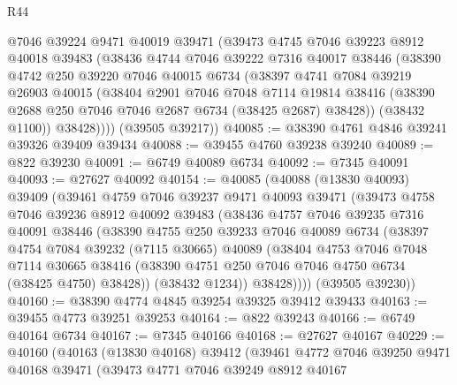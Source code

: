 \begin{lexlean}{R44}
\begin{coremodule}
{        @7046
        @39224
        @9471
        @40019
        @39471
        (@39473
          @4745
          @7046
          @39223
          @8912
          @40018
          @39483
          (@38436
            @4744
            @7046
            @39222
            @7316
            @40017
            @38446
            (@38390
              @4742
              @250
              @39220
              @7046
              @40015
              @6734
              (@38397
                @4741
                @7084
                @39219
                @26903
                @40015
                (@38404
                  @2901
                  @7046
                  @7048
                  @7114
                  @19814
                  @38416
                  (@38390 @2688 @250 @7046 @7046 @2687 @6734 (@38425 @2687) @38428))
                (@38432 @1100))
              @38428))))
      (@39505 @39217))
@40085 := @38390 @4761 @4846 @39241 @39326 @39409 @39434
@40088 := @39455 @4760 @39238 @39240
@40089 := @822 @39230
@40091 := @6749 @40089 @6734
@40092 := @7345 @40091
@40093 := @27627 @40092
@40154 := @40085
    (@40088
      (@13830 @40093)
      @39409
      (@39461
        @4759
        @7046
        @39237
        @9471
        @40093
        @39471
        (@39473
          @4758
          @7046
          @39236
          @8912
          @40092
          @39483
          (@38436
            @4757
            @7046
            @39235
            @7316
            @40091
            @38446
            (@38390
              @4755
              @250
              @39233
              @7046
              @40089
              @6734
              (@38397
                @4754
                @7084
                @39232
                (@7115 @30665)
                @40089
                (@38404
                  @4753
                  @7046
                  @7048
                  @7114
                  @30665
                  @38416
                  (@38390 @4751 @250 @7046 @7046 @4750 @6734 (@38425 @4750) @38428))
                (@38432 @1234))
              @38428))))
      (@39505 @39230))
@40160 := @38390 @4774 @4845 @39254 @39325 @39412 @39433
@40163 := @39455 @4773 @39251 @39253
@40164 := @822 @39243
@40166 := @6749 @40164 @6734
@40167 := @7345 @40166
@40168 := @27627 @40167
@40229 := @40160
    (@40163
      (@13830 @40168)
      @39412
      (@39461
        @4772
        @7046
        @39250
        @9471
        @40168
        @39471
        (@39473
          @4771
          @7046
          @39249
          @8912
          @40167
}
\end{coremodule}
\end{lexlean}
